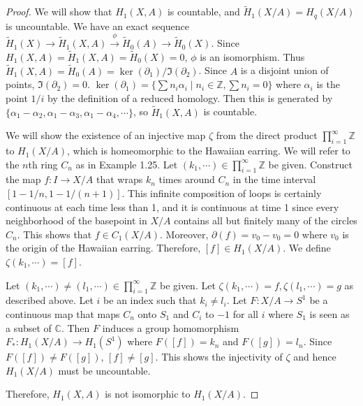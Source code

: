 \documentclass[12pt, psamsfonts]{amsart}
\theoremstyle{definition}
\theoremstyle{remark}
\numberwithin{equation}{section}
\begin{document}
\begin{proof}
  We will show that $H_1(X, A)$ is countable, and $\tilde{H}_1(X / A) = H_q(X / A)$ is uncountable.
  We have an exact sequence $\tilde{H}_1(X) \rightarrow \tilde{H}_1(X, A) \xrightarrow{\phi} \tilde{H}_0(A) \rightarrow \tilde{H}_0(X)$.
  Since $H_1(X, A) = \tilde{H}_1(X, A) = \tilde{H}_0(X) = 0$, $\phi$ is an isomorphism.
  Thus $\tilde{H}_1(X, A) = \tilde{H}_0(A) = \ker(\partial_1)/\Im(\partial_2)$.
  Since $A$ is a disjoint union of points, $\Im(\partial_2) = 0$.
  $\ker(\partial_1) = \{ \sum n_i\alpha_i \mid n_i \in \mathbb{Z}, \sum n_i = 0 \}$ where $\alpha_i$ is the point $1/i$ by the definition of a reduced homology.
  Then this is generated by $\{ \alpha_1 - \alpha_2, \alpha_1 - \alpha_3, \alpha_1 - \alpha_4, \cdots \}$, so $\tilde{H}_1(X, A)$ is countable.

  We will show the existence of an injective map $\zeta$ from the direct product $\prod_{i=1}^{\infty} \mathbb{Z}$ to $H_1(X / A)$, which is homeomorphic to the Hawaiian earring.
  We will refer to the $n$th ring $C_n$ as in Example 1.25.
  Let $(k_1, \cdots) \in \prod_{i=1}^{\infty} \mathbb{Z}$ be given.
  Construct the map $f: I \rightarrow X / A$ that wraps $k_n$ times around $C_n$ in the time interval $[1 - 1/n, 1 - 1/(n + 1)]$.
  This infinite composition of loops is certainly continuous at each time less than 1, and it is continuous at time 1 since every neighborhood of the basepoint in $X / A$ contains all but finitely many of the circles $C_n$.
  This shows that $f \in C_1(X / A)$.
  Moreover, $\partial(f) = v_0 - v_0 = 0$ where $v_0$ is the origin of the Hawaiian earring.
  Therefore, $[f] \in H_1(X / A)$.
  We define $\zeta(k_1, \cdots) = [f]$.

  Let $(k_1, \cdots) \ne (l_1, \cdots) \in \prod_{i=1}^{\infty} \mathbb{Z}$ be given.
  Let $\zeta(k_1, \cdots) = f, \zeta(l_1, \cdots) = g$ as described above.
  Let $i$ be an index such that $k_i \ne l_i$.
  Let $F: X / A \rightarrow S^1$ be a continuous map that maps $C_n$ onto $S_1$ and $C_i$ to $-1$ for all $i$ where $S_1$ is seen as a subset of $\mathbb{C}$.
  Then $F$ induces a group homomorphism $F_* : H_1(X / A) \rightarrow H_1(S^1)$ where $F([f]) = k_n$ and $F([g]) = l_n$.
  Since $F([f]) \ne F([g])$, $[f] \ne [g]$.
  This shows the injectivity of $\zeta$ and hence $H_1(X / A)$ must be uncountable.

  Therefore, $H_1(X, A)$ is not isomorphic to $H_1(X / A)$.
\end{proof}
\end{document}
